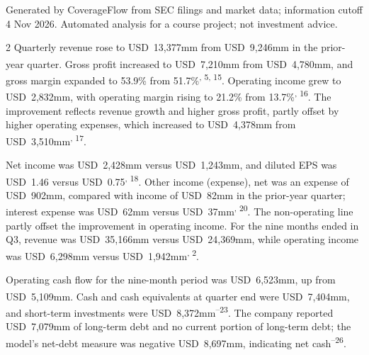 \documentclass[10pt,a4paper]{article}
\newcommand{\hrl}[3]{\par\nointerlineskip\vspace{#1}\noindent{\color{#2}\rule{\linewidth}{#3}}\par\nointerlineskip}
\renewcommand{\cite}[1]{\textsuperscript{\sffamily\color{accent}\fontsize{6.2}{6}\selectfont #1}}
\newcommand{\sectitle}[1]{\par\Needspace{40mm}\vspace{9pt}\noindent{\sffamily\fontsize{12}{14}\selectfont\bfseries\color{ink}#1}\hrl{3pt}{accent}{0.6pt}\vspace{2pt}\fontsize{10}{13}\selectfont\setlength{\parskip}{4pt}\RaggedRight}
\begin{document}
\vspace{\fill}
{\RaggedRight\sffamily\fontsize{6.3}{7.8}\selectfont\color{mute}Generated by CoverageFlow from SEC filings and market data; information cutoff 4 Nov 2026. Automated analysis for a course project; not investment advice.\par}

\clearpage
\sectitle{Results}
\begin{multicols}{2}
Quarterly revenue rose to USD~13,377mm from USD~9,246mm in the prior-year quarter\cite{1}. Gross profit increased to USD~7,210mm from USD~4,780mm, and gross margin expanded to 53.9\% from 51.7\%\cite{1, 5, 15}. Operating income grew to USD~2,832mm, with operating margin rising to 21.2\% from 13.7\%\cite{2, 16}. The improvement reflects revenue growth and higher gross profit, partly offset by higher operating expenses, which increased to USD~4,378mm from USD~3,510mm\cite{15, 17}.

Net income was USD~2,428mm versus USD~1,243mm, and diluted EPS was USD~1.46 versus USD~0.75\cite{6, 18}. Other income (expense), net was an expense of USD~902mm, compared with income of USD~82mm in the prior-year quarter; interest expense was USD~62mm versus USD~37mm\cite{19, 20}. The non-operating line partly offset the improvement in operating income. For the nine months ended in Q3, revenue was USD~35,166mm versus USD~24,369mm, while operating income was USD~6,298mm versus USD~1,942mm\cite{1, 2}.

Operating cash flow for the nine-month period was USD~6,523mm, up from USD~5,109mm\cite{21}. Cash and cash equivalents at quarter end were USD~7,404mm, and short-term investments were USD~8,372mm\cite{21--23}. The company reported USD~7,079mm of long-term debt and no current portion of long-term debt; the model’s net-debt measure was negative USD~8,697mm, indicating net cash\cite{24--26}.
\end{multicols}
\end{document}
